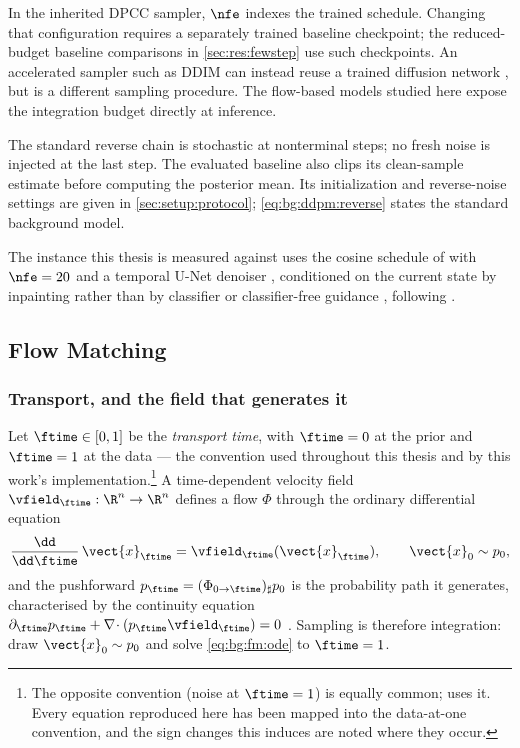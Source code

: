 In the inherited DPCC sampler, $\nfe$ indexes the trained schedule. Changing that configuration
requires a separately trained baseline checkpoint; the reduced-budget baseline comparisons in
\autoref{sec:res:fewstep} use such checkpoints. An accelerated sampler such as DDIM can instead
reuse a trained diffusion network \parencite{song2021denoising}, but is a different sampling procedure.
The flow-based models studied here expose the integration budget directly at inference.

The standard reverse chain is stochastic at nonterminal steps; no fresh noise is injected at the
last step. The evaluated baseline also clips its clean-sample estimate before computing the
posterior mean. Its initialization and reverse-noise settings are given in
\autoref{sec:setup:protocol}; \eqref{eq:bg:ddpm:reverse} states the standard background model.

The instance this thesis is measured against uses the cosine schedule of
\parencite{nichol2021improved} with $\nfe = 20$ and a temporal U-Net denoiser
\parencite{janner2022planning}, conditioned on the current state by inpainting rather than by
classifier or classifier-free guidance \parencite{dhariwal2021diffusion,ho2022classifier}, following
\parencite[Sec.~6.1]{romer2025diffusion}.

\subsection{Flow Matching}\label{sec:method:fm}

\subsubsection*{Transport, and the field that generates it}

Let $\ftime \in [0,1]$ be the \emph{transport time}, with $\ftime = 0$ at the prior and
$\ftime = 1$ at the data --- the convention used throughout this thesis and by this work's
implementation.\footnote{The opposite convention (noise at $\ftime=1$) is equally common;
\parencite{geng2025meanflow} uses it. Every equation reproduced here has been mapped into the
data-at-one convention, and the sign changes this induces are noted where they occur.}
A time-dependent velocity field $\vfield_{\ftime}:\R^{n}\to\R^{n}$ defines a flow
$\Phi$ through the ordinary differential equation
\begin{equation}\label{eq:bg:fm:ode}
  \frac{\dd}{\dd\ftime}\,\vect{x}_{\ftime} = \vfield_{\ftime}(\vect{x}_{\ftime}),
  \qquad \vect{x}_{0} \sim p_{0},
\end{equation}
and the pushforward $p_{\ftime} = (\Phi_{0\to\ftime})_{\sharp}p_{0}$ is the probability path
it generates, characterised by the continuity equation
$\partial_{\ftime}p_{\ftime} + \nabla\!\cdot(p_{\ftime}\vfield_{\ftime}) = 0$
\parencite[Sec.~2]{lipman2023flow}. Sampling is therefore integration: draw $\vect{x}_{0}\sim p_{0}$ and
solve \eqref{eq:bg:fm:ode} to $\ftime = 1$.


